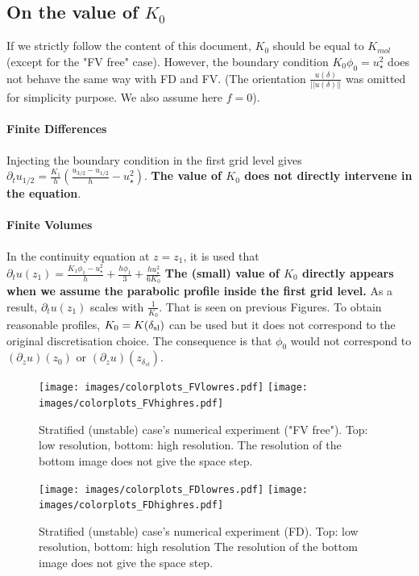 \subsection{On the value of $K_0$}
\label{sec:ND_StratifiedCase_viscosity0_FVpure}
If we strictly follow the content of this document,
$K_0$ should be equal to $K_{mol}$ (except for the "FV free" case).
However, the boundary condition $K_0 \phi_0 = u_\star^2$
does not behave the same way with FD and FV.
(The orientation $\frac{u(\delta)}{||u(\delta)||}$
was omitted for simplicity purpose. We also assume here $f=0$).

\paragraph{Finite Differences}
Injecting the boundary condition in the first grid level gives
$\partial_t u_{1/2} = \frac{K_1}{h}\left(\frac{u_{3/2} - u_{1/2}}{h}
 - u_\star^2
\right)$.
\textbf{The value of $K_0$ does not directly intervene in the equation}.

\paragraph{Finite Volumes}
In the continuity equation at $z=z_1$, it is used that
$\partial_t u(z_1) = \frac{K_1 \phi_1 - u_\star^2}{h}
+ \frac{h \phi_1}{3} + \frac{h u_\star^2}{6 K_0}$
\textbf{The (small) value of $K_0$ directly appears when we assume the
parabolic profile inside the first grid level.}
As a result, $\partial_t u(z_1)$ scales with $\frac{1}{K_0}$.
That is seen
on previous Figures.
To obtain reasonable profiles, $K_0=K(\delta_{\rm sl})$ can be used
but it does not correspond to the original discretisation choice.
The consequence is that $\phi_0$ would not correspond
to $(\partial_z u)(z_0)$ or $(\partial_z u)(z_{\delta_{sl}})$.


\begin{figure}
	\centering
	\texttt{[image: images/colorplots\_FVlowres.pdf]}
	\texttt{[image: images/colorplots\_FVhighres.pdf]}
	\caption{Stratified (unstable) case's numerical experiment ("FV free").
	Top: low resolution, bottom: high resolution.
	The resolution of the bottom image does not give the space step.
	}
	\label{fig:ND_StratifiedCase_NumericalExpUnstableColorplot}
\end{figure}

\begin{figure}
	\centering
	\texttt{[image: images/colorplots\_FDlowres.pdf]}
	\texttt{[image: images/colorplots\_FDhighres.pdf]}
	\caption{Stratified (unstable) case's numerical experiment (FD).
	Top: low resolution, bottom: high resolution
	The resolution of the bottom image does not give the space step.
	}
	\label{fig:ND_StratifiedCase_NumericalExpUnstableColorplot}
\end{figure}
